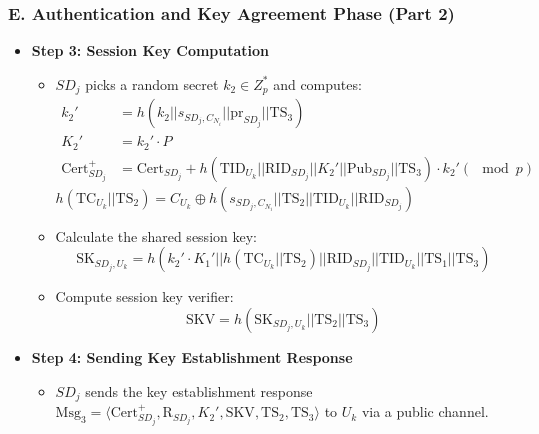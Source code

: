 \documentclass[9pt,handout]{beamer}
\begin{document}
\begin{frame}
    \frametitle{E. Authentication and Key Agreement Phase (Part 2)}


    \begin{itemize}
       
        \item \textbf{Step 3: Session Key Computation}
        \begin{itemize}
            \item \( SD_j \) picks a random secret \( k_2 \in Z^*_p \) and computes:
            \begin{align*}
                k_2' &= h(k_2 || s_{SD_j,C_{N_i}} || \text{pr}_{SD_j} || \text{TS}_3) \\
                K_2' &= k_2' \cdot P \\
                \text{Cert}^+_{SD_j} &= \text{Cert}_{SD_j} + h(\text{TID}_{U_k} || \text{RID}_{SD_j} || K_2' || \text{Pub}_{SD_j} || \text{TS}_3) \cdot k_2' (\mod p)
            \end{align*}
            \( h(\text{TC}_{U_k} || \text{TS}_2) = C_{U_k} \oplus h(s_{SD_j, C_{N_i}} || \text{TS}_2 || \text{TID}_{U_k} || \text{RID}_{SD_j}) \)

            \item Calculate the shared session key:
            \[
                \text{SK}_{SD_j,U_k} = h(k_2' \cdot K_1' || h(\text{TC}_{U_k} || \text{TS}_2) || \text{RID}_{SD_j} || \text{TID}_{U_k} || \text{TS}_1 || \text{TS}_3)
            \]
            \item Compute session key verifier:
            \[
                \text{SKV} = h(\text{SK}_{SD_j,U_k} || \text{TS}_2 || \text{TS}_3)
            \]
        \end{itemize}

        \item \textbf{Step 4: Sending Key Establishment Response}
        \begin{itemize}
            \item \( SD_j \) sends the key establishment response \( \text{Msg}_3 = \langle \text{Cert}^+_{SD_j}, \text{R}_{SD_j}, K_2', \text{SKV}, \text{TS}_2, \text{TS}_3 \rangle \) to \( U_k \) via a public channel.
        \end{itemize}
    \end{itemize}

\end{frame}
\end{document}
